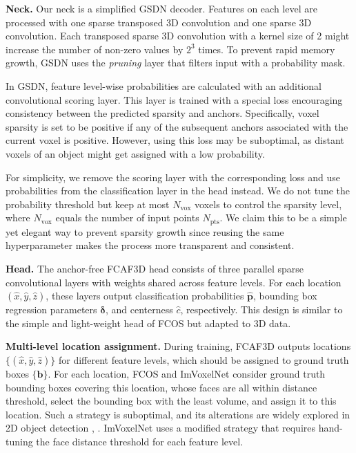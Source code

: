 \documentclass[runningheads]{llncs}
\begin{document}
\textbf{Neck.} Our neck is a simplified GSDN decoder. Features on each level are processed with one sparse transposed 3D convolution and one sparse 3D convolution. Each transposed sparse 3D convolution with a kernel size of 2 might increase the number of non-zero values by $2^3$ times. To prevent rapid memory growth, GSDN uses the \textit{pruning} layer that filters input with a probability mask.

In GSDN, feature level-wise probabilities are calculated with an additional convolutional scoring layer. This layer is trained with a special loss encouraging consistency between the predicted sparsity and anchors. Specifically, voxel sparsity is set to be positive if any of the subsequent anchors associated with the current voxel is positive. However, using this loss may be suboptimal, as distant voxels of an object might get assigned with a low probability. 

For simplicity, we remove the scoring layer with the corresponding loss and use probabilities from the classification layer in the head instead. We do not tune the probability threshold but keep at most $N_{\text{vox}}$ voxels to control the sparsity level, where $N_{\text{vox}}$ equals the number of input points $N_{\text{pts}}$. We claim this to be a simple yet elegant way to prevent sparsity growth since reusing the same hyperparameter makes the process more transparent and consistent.


\textbf{Head.} The anchor-free FCAF3D head consists of three parallel sparse convolutional layers with weights shared across feature levels. For each location $(\hat{x}, \hat{y}, \hat{z})$, these layers output classification probabilities $\hat{\boldsymbol{p}}$, bounding box regression parameters $\boldsymbol{\delta}$, and centerness $\hat{c}$, respectively. This design is similar to the simple and light-weight head of FCOS \cite{tian2019fcos} but adapted to 3D data.

\textbf{Multi-level location assignment.} During training, FCAF3D outputs locations $\{(\hat{x},\hat{y},\hat{z})\}$ for different feature levels, which should be assigned to ground truth boxes $\{\boldsymbol{b}\}$. For each location, FCOS \cite{tian2019fcos} and ImVoxelNet \cite{rukhovich2021imvoxelnet} consider ground truth bounding boxes covering this location, whose faces are all within distance threshold, select the bounding box with the least volume, and assign it to this location. Such a strategy is suboptimal, and its alterations are widely explored in 2D object detection \cite{zhang2020atss}, \cite{ge2021ota}. ImVoxelNet \cite{rukhovich2021imvoxelnet} uses a modified strategy that requires hand-tuning the face distance threshold for each feature level.
\end{document}
